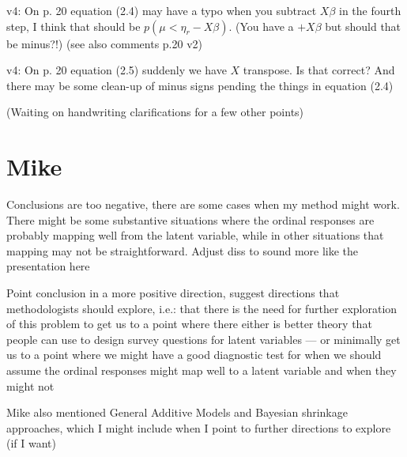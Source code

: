 \documentclass[12pt]{article}
\begin{document}
\begin{coi}
		\item v4: On p. 20 equation (2.4) may have a typo when you subtract $X \beta$ in the fourth step, I think that should be $p(\mu < \eta_r - X\beta)$. (You have a $+ X \beta$ but should that be minus?!) (see also comments p.20 v2)
		\item v4: On p. 20 equation (2.5) suddenly we have $X$ transpose. Is that correct? And there may be some clean-up of minus signs pending the things in equation (2.4)
		\item (Waiting on handwriting clarifications for a few other points)
	\end{coi}

\section*{Mike}
	\begin{coi}
		\item Conclusions are too negative, there are some cases when my method might work. There might be some substantive situations where the ordinal responses are probably mapping well from the latent variable, while in other situations that mapping may not be straightforward. Adjust diss to sound more like the presentation here
		\item Point conclusion in a more positive direction, suggest directions that methodologists should explore, i.e.: that there is the need for further exploration of this problem to get us to a point where there either is better theory that people can use to design survey questions for latent variables --- or minimally get us to a point where we might have a good diagnostic test for when we should assume the ordinal responses might map well to a latent variable and when they might not
		\item Mike also mentioned General Additive Models and Bayesian shrinkage approaches, which I might include when I point to further directions to explore (if I want)
	\end{coi}
\end{document}
